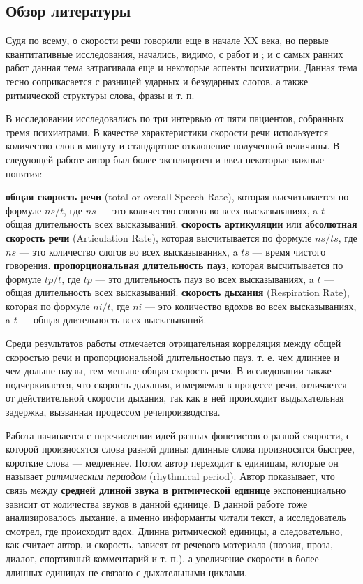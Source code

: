 \subsection{Обзор литературы}
\noindent Судя по всему, о скорости речи говорили еще в начале XX века, но первые квантитативные исследования, начались, видимо, с работ \citep{goldman54} и \citep{goldman56}; и с самых ранних работ данная тема затрагивала еще и некоторые аспекты психиатрии. Данная тема тесно соприкасается с разницей ударных и безударных слогов, а также ритмической структуры слова, фразы и т. п.
\par В исследовании \citep{goldman54} исследовались по три интервью от пяти пациентов, собранных тремя психиатрами. В качестве характеристики скорости речи используется количество слов в минуту и стандартное отклонение полученной величины. В следующей работе \citep{goldman56} автор был более эксплицитен и ввел некоторые важные понятия:
\begin{itemize}
\mytem \textbf{общая скорость речи} (total or overall Speech Rate), которая высчитывается по формуле ${ns}/t$, где ${ns}$ --- это количество слогов во всех высказываниях, a $t$ --- общая длительность всех высказываний.
\mytem \textbf{скорость артикуляции} или \textbf{абсолютная скорость речи} (Articulation Rate), которая высчитывается по формуле $ns/ts$, где $ns$ --- это количество слогов во всех высказываниях, a $ts$ --- время чистого говорения.
\mytem \textbf{пропорциональная длительность пауз}, которая высчитывается по формуле $tp/t$, где $tp$ --- это длительность пауз во всех высказываниях, a $t$ --- общая длительность всех высказываний.
\mytem \textbf{скорость дыхания} (Respiration Rate), которая по формуле $ni/t$, где ${ni}$ --- это количество вдохов во всех высказываниях, a $t$ --- общая длительность всех высказываний.
\end{itemize}
\par Среди результатов работы \citep{goldman56} отмечается отрицательная корреляция между общей скоростью речи и пропорциональной длительностью пауз, т. е. чем длиннее и чем дольше паузы, тем меньше общая скорость речи. В исследовании также подчеркивается, что скорость дыхания, измеряемая в процессе речи, отличается от действительной скорости дыхания, так как в ней происходит выдыхательная задержка, вызванная процессом речепроизводства.
\par Работа \citep{fonagy60} начинается с перечислении идей разных фонетистов о разной скорости, с которой произносятся слова разной длины: длинные слова произносятся быстрее, короткие слова --- медленнее. Потом автор переходит к единицам, которые он называет \textit{ритмическим периодом} (rhythmical period). Автор показывает, что связь между \textbf{средней длиной звука в ритмической единице} экспоненциально зависит от количества звуков в данной единице. В данной работе тоже анализировалось дыхание, а именно информанты читали текст, а исследователь смотрел, где происходит вдох. Длинна ритмической единицы, а следовательно, как считает автор, и скорость, зависят от речевого материала (поэзия, проза, диалог, спортивный комментарий и т. п.), а увеличение скорости в более длинных единицах не связано с дыхательными циклами. 
